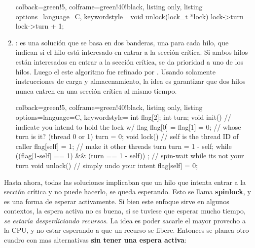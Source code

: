 \documentclass[openany]{book}
\begin{document}
\begin{enumerate}
\begin{tcblisting}{colback=green!5, colframe=green!40!black, listing only, listing options={language=C, keywordstyle=\color{blue!35!white}\bfseries}}
        void unlock(lock_t *lock) {
        lock->turn = lock->turn + 1;
    }
    \end{tcblisting}            
    \item {}: es una solución que se basa en dos banderas, una para cada hilo, que indican si el hilo está interesado en entrar a la sección crítica. Si ambos hilos están interesados en entrar a la sección crítica, se da prioridad a uno de los hilos. Luego el este algoritmo fue refinado por . Usando solamente instrucciones de carga y almacenamiento, la idea es garantizar que dos hilos nunca entren en una sección crítica al mismo tiempo.
    \begin{tcblisting}{colback=green!5, colframe=green!40!black, listing only, listing options={language=C, keywordstyle=\color{blue!35!white}\bfseries}}
    int flag[2];
    int turn;
    void init() {
        // indicate you intend to hold the lock w/ flag
        flag[0] = flag[1] = 0;
        // whose turn is it? (thread 0 or 1)
        turn = 0;
    }
    void lock() {
        // self is the thread ID of caller
        flag[self] = 1;
        // make it other threads turn
        turn = 1 - self;
        while ((flag[1-self] == 1) && (turn == 1 - self))
            ; // spin-wait while its not your turn
    }
    void unlock() {
        // simply undo your intent
        flag[self] = 0;
    }
    \end{tcblisting}
\end{enumerate}

Hasta ahora, todas las soluciones implicaban que un hilo que intenta entrar a la sección crítica y no puede hacerlo, se queda esperando. Esto se llama \textbf{spinlock}, y es una forma de esperar activamente. Si bien este enfoque sirve en algunos contextos, la espera activa no es buena, si se tuviese que esperar mucho tiempo, \textit{se estaría desperdiciando recursos}. La idea es poder sacarle el mayor provecho a la CPU, y no estar esperando a que un recurso se libere. Entonces se planea otro cuadro con mas alternativas \textbf{sin tener una espera activa}:
\end{document}
